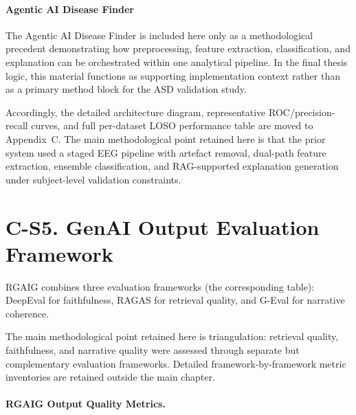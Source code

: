 \paragraph{Agentic AI Disease Finder} %
The Agentic AI Disease Finder is included here only as a methodological precedent demonstrating how preprocessing, feature extraction, classification, and explanation can be orchestrated within one analytical pipeline. In the final thesis logic, this material functions as supporting implementation context rather than as a primary method block for the ASD validation study.

Accordingly, the detailed architecture diagram, representative ROC/precision-recall curves, and full per-dataset LOSO performance table are moved to Appendix~C. The main methodological point retained here is that the prior system used a staged EEG pipeline with artefact removal, dual-path feature extraction, ensemble classification, and RAG-supported explanation generation under subject-level validation constraints.

\section*{C-S5. GenAI Output Evaluation Framework}
\label{sec:appc_genai_eval}

RGAIG combines three evaluation frameworks (the corresponding table): DeepEval for faithfulness, RAGAS for retrieval quality, and G-Eval for narrative coherence.

\noindent The main methodological point retained here is triangulation: retrieval quality, faithfulness, and narrative quality were assessed through separate but complementary evaluation frameworks. Detailed framework-by-framework metric inventories are retained outside the main chapter.


\paragraph{RGAIG Output Quality Metrics.}

